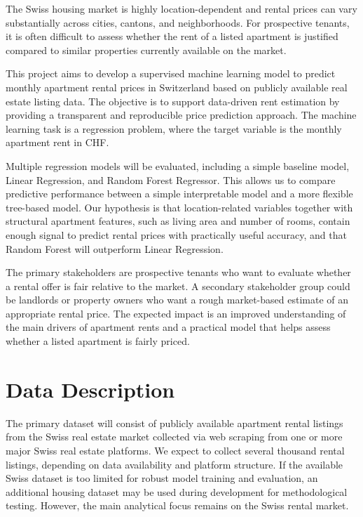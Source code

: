 \documentclass[11pt,a4paper]{article}
\begin{document}
The Swiss housing market is highly location-dependent and rental prices can vary substantially across cities, cantons, and neighborhoods. For prospective tenants, it is often difficult to assess whether the rent of a listed apartment is justified compared to similar properties currently available on the market.

This project aims to develop a supervised machine learning model to predict monthly apartment rental prices in Switzerland based on publicly available real estate listing data. The objective is to support data-driven rent estimation by providing a transparent and reproducible price prediction approach. The machine learning task is a regression problem, where the target variable is the monthly apartment rent in CHF.

Multiple regression models will be evaluated, including a simple baseline model, Linear Regression, and Random Forest Regressor. This allows us to compare predictive performance between a simple interpretable model and a more flexible tree-based model. Our hypothesis is that location-related variables together with structural apartment features, such as living area and number of rooms, contain enough signal to predict rental prices with practically useful accuracy, and that Random Forest will outperform Linear Regression.

The primary stakeholders are prospective tenants who want to evaluate whether a rental offer is fair relative to the market. A secondary stakeholder group could be landlords or property owners who want a rough market-based estimate of an appropriate rental price. The expected impact is an improved understanding of the main drivers of apartment rents and a practical model that helps assess whether a listed apartment is fairly priced.


\section{Data Description}

The primary dataset will consist of publicly available apartment rental listings from the Swiss real estate market collected via web scraping from one or more major Swiss real estate platforms. We expect to collect several thousand rental listings, depending on data availability and platform structure. If the available Swiss dataset is too limited for robust model training and evaluation, an additional housing dataset may be used during development for methodological testing. However, the main analytical focus remains on the Swiss rental market.
\end{document}
